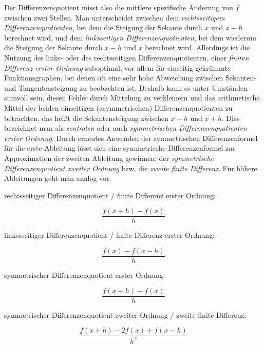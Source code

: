 \documentclass{scrartcl}
\begin{document}
Der Differenzenquotient misst also die mittlere spezifische Änderung von $f$ zwischen zwei Stellen. Man unterscheidet zwischen dem \textit{rechtsseitigem Differenzenquotienten}, bei dem die Steigung der Sekante durch $x$ und $x+h$ berechnet wird, und dem \textit{linksseitigen Differenzenquotienten}, bei dem wiederum die Steigung der Sekante durch $x-h$ und $x$ berechnet wird. Allerdings ist die Nutzung des links- oder des rechtsseitigen Differenzenquotienten, einer \textit{finiten Differenz erster Ordnung} suboptimal, vor allem für einseitig gekrümmte Funktionsgraphen, bei denen oft eine sehr hohe Abweichung zwischen Sekanten- und Tangentensteigung zu beobachten ist. Deshalb kann es unter Umständen sinnvoll sein, diesen Fehler durch Mittelung zu verkleinern und das arithmetische Mittel der beiden einseitigen (asymmetrischen) Differenzenquotienten zu betrachten, das heißt die Sekantensteigung zwischen $x-h$ und $x+h$. Dies bezeichnet man als \textit{zentralen} oder auch \textit{symmetrischen Differenzenquotienten erster Ordnung}. Durch erneutes Anwenden der symmetrischen Differenzenformel für die erste Ableitung lässt sich eine symmetrische Differenzenformel zur Approximation der zweiten Ableitung gewinnen: der \textit{symmetrische Differenzenquotient zweiter Ordnung} bzw. die \textit{zweite finite Differenz}. Für höhere Ableitungen geht man analog vor.\cite{westermann}
\begin{shaded}
\begin{center}
 rechtsseitiger Differenzenquotient / finite Differenz erster Ordnung:
 \end{center} \[ \frac {f(x+h) - f(x)}{h} \]
\begin{center}
 linkssseitiger Differenzenquotient / finite Differenz erster Ordnung:
 \end{center} \[ \frac {f(x) - f(x-h)}{h} \]
\begin{center}
 symmetrischer Differenzenquotient erster Ordnung:
 \end{center} \[ \frac {f(x+h) - f(x)}{h} \]
\begin{center}
 symmetrischer Differenzenquotient zweiter Ordnung / zweite finite Differenz:
 \end{center} \[ \frac{f(x+h)-2f(x)+f(x-h)}{h^2} \]
\end{shaded}
\end{document}
